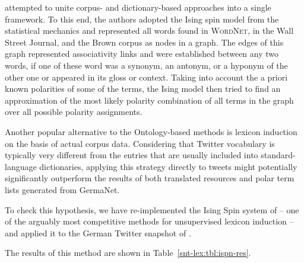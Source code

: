 

\citet{Takamura:05} attempted to unite corpus- and dictionary-based
approaches into a single framework.  To this end, the authors adopted
the Ising spin model from the statistical mechanics and represented
all words found in \textsc{WordNet}, in the Wall Street Journal, and
the Brown corpus as nodes in a graph.  The edges of this graph
represented associativity links and were established between any two
words, if one of these word was a synonym, an antonym, or a hyponym of
the other one or appeared in its gloss or context.  Taking into
account the a priori known polarities of some of the terms, the Ising
model then tried to find an approximation of the most likely polarity
combination of all terms in the graph over all possible polarity
assignments.

Another popular alternative to the Ontology-based methods is lexicon
induction on the basis of actual corpus data.  Considering that
Twitter vocabulary is typically very different from the entries that
are usually included into standard-language dictionaries, applying
this strategy directly to tweets might potentially significantly
outperform the results of both translated resources and polar term
lists generated from GermaNet.

To check this hypothesis, we have re-implemented the Ising Spin system
of \citet{Takamura:05} -- one of the arguably most competitive methods
for unsupervised lexicon induction -- and applied it to the German
Twitter snapshot of \cite{Scheffler:14}.

The results of this method are shown in Table~\ref{snt-lex:tbl:ispn-res}.

